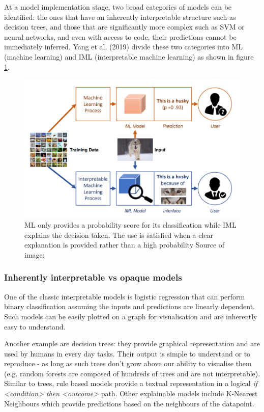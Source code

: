 \documentclass[proposal]{softeng}
\begin{document}
At a model implementation stage, two broad categories of models can be identified: the ones that have an inherently interpretable structure such as decision trees, and those that are significantly more complex such as SVM or neural networks, and even with access to code, their predictions cannot be immediately inferred. Yang et al. (2019) \cite{YangFan2019EEWG} divide these two categories into ML (machine learning) and IML (interpretable machine learning) as shown in figure \ref{fig:iml}. 

\begin{figure}[h!]
\centering
  \includegraphics[width=.8\textwidth]{images/iml.png}
  \caption{ML only provides a probability score for its classification while IML explains the decision taken. The use is satisfied when a clear explanation is provided rather than a high probability Source of image:\cite{YangFan2019EEWG}}
  \label{fig:iml}
\end{figure}

\subsubsection{Inherently interpretable vs opaque models}

One of the classic interpretable models is logistic regression that can perform binary classification assuming the inputs and predictions are linearly dependent. Such models can be easily plotted on a graph for visualisation and are inherently easy to understand. 

Another example are decision trees: they provide graphical representation and are used by humans in every day tasks. Their output is simple to understand or to reproduce - as long as such trees don't grow above our ability to visualise them (e.g. random forests are composed of hundreds of trees and are not interpretable). Similar to trees, rule based models provide a textual representation in a logical \textit{if <condition> then <outcome>} path. Other explainable models include K-Nearest Neighbours which provide predictions based on the neighbours of the datapoint. 
\end{document}

